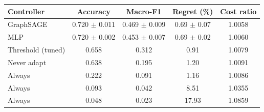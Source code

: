 \begin{tabular}{lcccc}
\toprule
Controller & Accuracy & Macro-F1 & Regret (\%) & Cost ratio \\
\midrule
GraphSAGE & 0.720 $\pm$ 0.011 & 0.469 $\pm$ 0.009 & 0.69 $\pm$ 0.07 & 1.0058 \\
MLP & 0.720 $\pm$ 0.002 & 0.453 $\pm$ 0.007 & 0.69 $\pm$ 0.02 & 1.0060 \\
Threshold (tuned) & 0.658 & 0.312 & 0.91 & 1.0079 \\
Never adapt & 0.638 & 0.195 & 1.20 & 1.0091 \\
Always \TA{} & 0.222 & 0.091 & 1.16 & 1.0086 \\
Always \RB{} & 0.093 & 0.042 & 8.51 & 1.0355 \\
Always \RP{} & 0.048 & 0.023 & 17.93 & 1.0859 \\
\bottomrule
\end{tabular}
